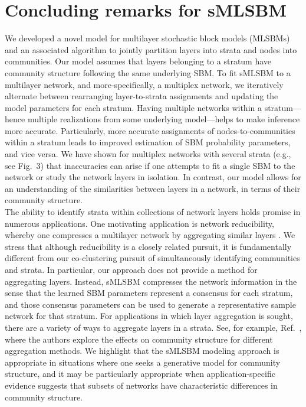 \section{Concluding remarks for sMLSBM}

\indent 
We developed a novel model for multilayer stochastic block models (MLSBMs) and an associated algorithm to jointly partition layers into strata and nodes into communities. Our model assumes that layers belonging to a stratum have community structure following the same underlying SBM. To fit sMLSBM to a multilayer network, and more-specifically, a multiplex network, we iteratively alternate between rearranging layer-to-strata assignments and updating the model parameters for each stratum. Having multiple networks within a stratum---hence multiple realizations from some underlying model---helps to make inference more accurate. Particularly, more accurate assignments of nodes-to-communities within a stratum leads to improved estimation of SBM probability parameters, and vice versa. 
We have shown for multiplex networks with several strata (e.g., see Fig.~3) that inaccuracies can arise if one attempts to fit a single SBM to the network or study the network layers in isolation.
In contrast, our model allows for an understanding of the similarities between layers in a network, in terms of their community structure. 
%
\\\indent
The ability to identify strata within collections of network layers holds promise in numerous applications. 
One motivating application is network reducibility, whereby one compresses a multilayer network by aggregating similar layers \cite{domen}. We stress that although reducibility is a closely related pursuit, it is fundamentally different from our co-clustering pursuit of simultaneously identifying communities and strata. In particular, our approach does not provide a method for aggregating layers. Instead, sMLSBM compresses the network information in the sense that the learned SBM parameters represent a consensus for each stratum, and those consensus parameters can be used to generate a representative sample network for that stratum. For applications in which layer aggregation is sought, there are a variety of ways to aggregate layers in a strata. See, for example, Ref.~\cite{taylor2015enhanced}, where the authors explore the effects on community structure for different aggregation methods. We highlight that the sMLSBM modeling approach is appropriate in situations where one seeks a generative model for community structure, and it may be particularly appropriate when application-specific evidence suggests that subsets of networks have characteristic differences in community structure.
